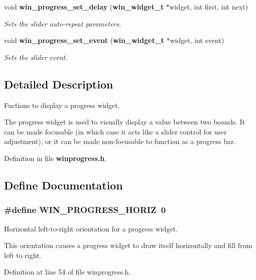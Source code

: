 \begin{CompactItemize}
void {\bf win\_\-progress\_\-set\_\-delay} ({\bf win\_\-widget\_\-t} $\ast$widget, int first, int next)
\begin{CompactList}\small\item\em Sets the slider auto-repeat parameters. \item\end{CompactList}\item 
void {\bf win\_\-progress\_\-set\_\-event} ({\bf win\_\-widget\_\-t} $\ast$widget, int event)
\begin{CompactList}\small\item\em Sets the slider event. \item\end{CompactList}\end{CompactItemize}


\subsection{Detailed Description}
Fuctions to display a progress widget. 

The progress widget is used to visually display a value between two bounds. It can be made focusable (in which case it acts like a slider control for user adjustment), or it can be made non-focusable to function as a progress bar. 

Definition in file {\bf winprogress.h}.

\subsection{Define Documentation}
\subsubsection{\setlength{\rightskip}{0pt plus 5cm}\#define WIN\_\-PROGRESS\_\-HORIZ~0}\label{winprogress_8h_a0}


Horizontal left-to-right orientation for a progress widget. 

This orientation causes a progress widget to draw itself horizontally and fill from left to right. 

Definition at line 54 of file winprogress.h.
